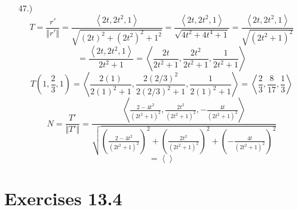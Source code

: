 \documentclass[12pt]{article}
\newcommand{\angleb}[1]{\left\langle#1\right\rangle}
\newcommand{\parns}[1]{\left(#1\right)}
\begin{document}
\begin{itemize}
    \item [47.)] \[T=\frac{r'}{\Vert r'\Vert}=\frac{\angleb{2t,2t^2,1}}{\sqrt{(2t)^2+(2t^2)^2+1^2}}=\frac{\angleb{2t,2t^2,1}}{\sqrt{4t^2+4t^4+1}}=\frac{\angleb{2t,2t^2,1}}{\sqrt{(2t^2+1)^2}}\]
    \[=\frac{\angleb{2t,2t^2,1}}{2t^2+1}=\angleb{\frac{2t}{2t^2+1},\frac{2t^2}{2t^2+1},\frac{1}{2t^2+1}}\]
    \[T\parns{1,\frac{2}{3},1}=\angleb{\frac{2(1)}{2(1)^2+1},\frac{2(2/3)^2}{2(2/3)^2+1},\frac{1}{2(1)^2+1}}=\angleb{\frac{2}{3},\frac{8}{17},\frac{1}{3}}\]
    \[N=\frac{T'}{\Vert T'\Vert}=\frac{\angleb{\frac{2-4t^2}{(2t^2+1)^2},\frac{2t^2}{(2t^2+1)^2},-\frac{4t}{(2t^2+1)^2}}}{\sqrt{\parns{\frac{2-4t^2}{(2t^2+1)^2}}^2+\parns{\frac{2t^2}{(2t^2+1)^2}}^2+\parns{-\frac{4t}{(2t^2+1)^2}}^2}}\]
    \[=\angleb{ }\]

\end{itemize}
\section*{Exercises 13.4}
\end{document}
